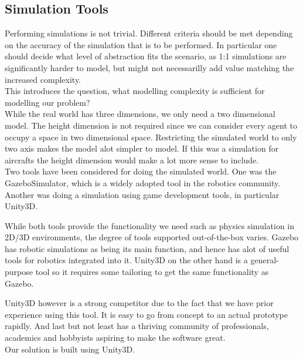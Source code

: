 \documentclass[titlepage]{article}
\begin{document}
\subsection{Simulation Tools}
Performing simulations is not trivial. Different criteria should be met depending on the accuracy of the simulation that is to be performed.
In particular one should decide what level of abstraction fits the scenario, as 1:1 simulations are significantly harder to model, but might not necessarilly add value matching the increased complexity.\\

This introduces the question, what modelling complexity is sufficient for modelling our problem?\\

While the real world has three dimensions, we only need a two dimensional model.
The height dimension is not required since we can consider every agent to occupy a space in two dimensional space.
Restricting the simulated world to only two axis makes the model alot simpler to model.
If this was a simulation for aircrafts the height dimension would make a lot more sense to include.\\

Two tools have been considered for doing the simulated world. One was the GazeboSimulator, which is a widely adopted tool in the robotics community.
Another was doing a simulation using game development tools, in particular Unity3D.

While both tools provide the functionality we need such as physics simulation in 2D/3D  environments, the degree of tools supported out-of-the-box varies.
Gazebo has robotic simulations as being its main function, and hence has alot of useful tools for robotics integrated into it.
Unity3D on the other hand is a general-purpose tool so it requires some tailoring to get the same functionality as Gazebo.

Unity3D however is a strong competitor due to the fact that we have prior experience using this tool. It is easy to go from concept to an actual prototype rapidly. And last but not least has a thriving community of professionals, academics and hobbyists aspiring to make the software great.\\
Our solution is built using Unity3D.\\
\end{document}
